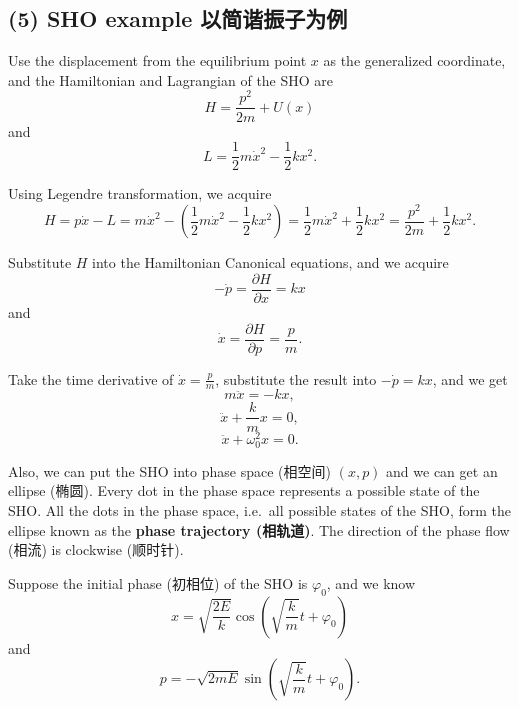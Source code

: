 \subsection*{(5) SHO example
以简谐振子为例}\label{sho-example-ux4ee5ux7b80ux8c10ux632fux5b50ux4e3aux4f8b}

Use the displacement from the equilibrium point \(x\) as the generalized
coordinate, and the Hamiltonian and Lagrangian of the SHO are
\[H = \frac{p^2}{2m} + U(x)\] and
\[L = \frac{1}{2} m \dot{x}^2 - \frac{1}{2} kx^2.\]

Using Legendre transformation, we acquire
\[H = p \dot{x} - L = m \dot{x}^2 - \left( \frac{1}{2} m \dot{x}^2 - \frac{1}{2} kx^2 \right) = \frac{1}{2} m \dot{x}^2 + \frac{1}{2} kx^2 = \frac{p^2}{2m} + \frac{1}{2} kx^2.\]

Substitute \(H\) into the Hamiltonian Canonical equations, and we
acquire \[- \dot{p} = \frac{\partial H}{\partial x} = kx\] and
\[\dot{x} = \frac{\partial H}{\partial p} = \frac{p}{m}.\]

Take the time derivative of \(\displaystyle \dot{x} = \frac{p}{m}\),
substitute the result into \(-\dot{p} = kx\), and we get
\[m \ddot{x} = - kx,\] \[\ddot{x} + \frac{k}{m} x = 0,\]
\[\ddot{x} + \omega^2_0 x = 0.\]

Also, we can put the SHO into phase space (相空间) \((x, p)\) and we can
get an ellipse (椭圆). Every dot in the phase space represents a
possible state of the SHO. All the dots in the phase space, i.e.~all
possible states of the SHO, form the ellipse known as the \textbf{phase
trajectory (相轨道)}. The direction of the phase flow (相流) is
clockwise (顺时针).

\begin{center}
\end{center}

Suppose the initial phase (初相位) of the SHO is \(\varphi_0\), and we know
\[x = \sqrt{\frac{2E}{k}} \cos \left( \sqrt{\frac{k}{m}} t + \varphi_0 \right)\]
and
\[p = - \sqrt{2mE} \sin \left( \sqrt{\frac{k}{m}} t + \varphi_0 \right).\]

